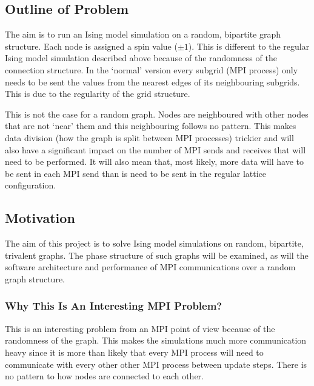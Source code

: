 \documentclass[pdftex,12pt,a4paper]{article}
\begin{document}

\subsection{Outline of Problem}

The aim is to run an Ising model simulation on a random, bipartite graph structure. Each node is assigned a spin value ($\pm1$). This is different to the regular Ising model simulation described above because of the randomness of the connection structure. In the `normal' version every subgrid (MPI process) only needs to be sent the values from the nearest edges of its neighbouring subgrids. This is due to the regularity of the grid structure.

This is not the case for a random graph. Nodes are neighboured with other nodes that are not `near' them and this neighbouring follows no pattern. This makes data division (how the graph is split between MPI processes) trickier and will also have a significant impact on the number of MPI sends and receives that will need to be performed. It will also mean that, most likely, more data will have to be sent in each MPI send than is need to be sent in the regular lattice configuration.


\subsection{Motivation}

The aim of this project is to solve Ising model simulations on random, bipartite, trivalent graphs. The phase structure of such graphs will be examined, as will the software architecture and performance of MPI communications over a random graph structure.


\subsubsection{Why This Is An Interesting MPI Problem?}

This is an interesting problem from an MPI point of view because of the randomness of the graph. This makes the simulations much more communication heavy since it is more than likely that every MPI process will need to communicate with every other other MPI process between update steps. There is no pattern to how nodes are connected to each other.
\end{document}
